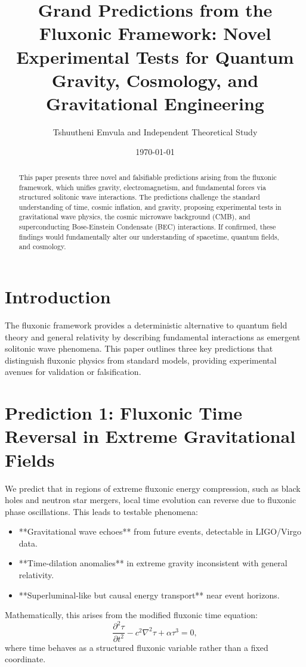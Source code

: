 \documentclass{article}
\title{Grand Predictions from the Fluxonic Framework: Novel Experimental Tests for Quantum Gravity, Cosmology, and Gravitational Engineering}
\author{Tshuutheni Emvula and Independent Theoretical Study}
\date{\today}
\begin{document}
\maketitle

\begin{abstract}
This paper presents three novel and falsifiable predictions arising from the fluxonic framework, which unifies gravity, electromagnetism, and fundamental forces via structured solitonic wave interactions. The predictions challenge the standard understanding of time, cosmic inflation, and gravity, proposing experimental tests in gravitational wave physics, the cosmic microwave background (CMB), and superconducting Bose-Einstein Condensate (BEC) interactions. If confirmed, these findings would fundamentally alter our understanding of spacetime, quantum fields, and cosmology.
\end{abstract}

\section{Introduction}
The fluxonic framework provides a deterministic alternative to quantum field theory and general relativity by describing fundamental interactions as emergent solitonic wave phenomena. This paper outlines three key predictions that distinguish fluxonic physics from standard models, providing experimental avenues for validation or falsification.

\section{Prediction 1: Fluxonic Time Reversal in Extreme Gravitational Fields}
We predict that in regions of extreme fluxonic energy compression, such as black holes and neutron star mergers, local time evolution can reverse due to fluxonic phase oscillations. This leads to testable phenomena:
\begin{itemize}
    \item **Gravitational wave echoes** from future events, detectable in LIGO/Virgo data.
    \item **Time-dilation anomalies** in extreme gravity inconsistent with general relativity.
    \item **Superluminal-like but causal energy transport** near event horizons.
\end{itemize}
Mathematically, this arises from the modified fluxonic time equation:
\begin{equation}
    \frac{\partial^2 \tau}{\partial t^2} - c^2 \nabla^2 \tau + \alpha \tau^3 = 0,
\end{equation}
where time behaves as a structured fluxonic variable rather than a fixed coordinate.
\end{document}
